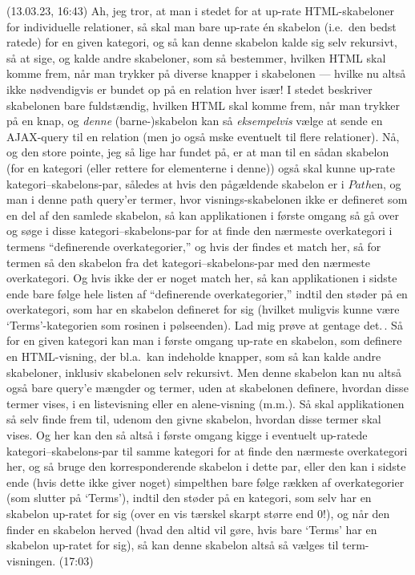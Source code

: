 \documentclass{report}
\begin{document}
(13.03.23, 16:43) Ah, jeg tror, at man i stedet for at up-rate HTML-skabeloner for individuelle relationer, så skal man bare up-rate én skabelon (i.e.\ den bedst ratede) for en given kategori, og så kan denne skabelon kalde sig selv rekursivt, så at sige, og kalde andre skabeloner, som så bestemmer, hvilken HTML skal komme frem, når man trykker på diverse knapper i skabelonen --- hvilke nu altså ikke nødvendigvis er bundet op på en relation hver især! I stedet beskriver skabelonen bare fuldstændig, hvilken HTML skal komme frem, når man trykker på en knap, og \emph{denne} (barne-)skabelon kan så \emph{eksempelvis} vælge at sende en AJAX-query til en relation (men jo også mske eventuelt til flere relationer). Nå, og den store pointe, jeg så lige har fundet på, er at man til en sådan skabelon (for en kategori (eller rettere for elementerne i denne)) også skal kunne up-rate kategori--skabelons-par, således at hvis den pågældende skabelon er i $Path$en, og man i denne path query'er termer, hvor visnings-skabelonen ikke er defineret som en del af den samlede skabelon, så kan applikationen i første omgang så gå over og søge i disse kategori--skabelons-par for at finde den nærmeste overkategori i termens ``definerende overkategorier,'' og hvis der findes et match her, så for termen så den skabelon fra det kategori--skabelons-par med den nærmeste overkategori. Og hvis ikke der er noget match her, så kan applikationen i sidste ende bare følge hele listen af ``definerende overkategorier,'' indtil den støder på en overkategori, som har en skabelon defineret for sig (hvilket muligvis kunne være `Terms'-kategorien som rosinen i pølseenden). Lad mig prøve at gentage det.\,. Så for en given kategori kan man i første omgang up-rate en skabelon, som definere en HTML-visning, der bl.a.\ kan indeholde knapper, som så kan kalde andre skabeloner, inklusiv skabelonen selv rekursivt. Men denne skabelon kan nu altså også bare query'e mængder og termer, uden at skabelonen definere, hvordan disse termer vises, i en listevisning eller en alene-visning (m.m.). Så skal applikationen så selv finde frem til, udenom den givne skabelon, hvordan disse termer skal vises. Og her kan den så altså i første omgang kigge i eventuelt up-ratede kategori--skabelons-par til samme kategori for at finde den nærmeste overkategori her, og så bruge den korresponderende skabelon i dette par, eller den kan i sidste ende (hvis dette ikke giver noget) simpelthen bare følge rækken af overkategorier (som slutter på `Terms'), indtil den støder på en kategori, som selv har en skabelon up-ratet for sig (over en vis tærskel skarpt større end 0!), og når den finder en skabelon herved (hvad den altid vil gøre, hvis bare `Terms' har en skabelon up-ratet for sig), så kan denne skabelon altså så vælges til term-visningen. (17:03)
\end{document}
